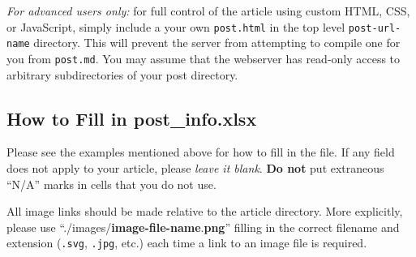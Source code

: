 \documentclass[paper=a4, fontsize=11pt]{scrartcl}
\numberwithin{equation}{section}        %
\numberwithin{figure}{section}            %
\numberwithin{table}{section}                %
\begin{document}
\emph{For advanced users only:} for full control of the article using custom
HTML, CSS, or JavaScript, simply include a your own \texttt{post.html} in
the top level \texttt{post-url-name} directory. This will
prevent the server from attempting to compile one for you from \texttt{post.md}.
You may assume that the webserver has read-only access to arbitrary
subdirectories of your post directory.

\subsection{How to Fill in post\_info.xlsx}\label{sec:excel}
Please see the examples mentioned above for how to fill in the file. If any
field does not apply to your article, please \textit{leave it blank}. \textbf{Do
not} put
extraneous ``N/A'' marks in cells that you do not use.

All image links should be made relative to the article
directory. More explicitly, please use
``./images/\textbf{image-file-name}.\textbf{png}''
filling in the correct filename and extension (\texttt{.svg}, \texttt{.jpg},
etc.) each time a link to an image file is required.
\end{document}
